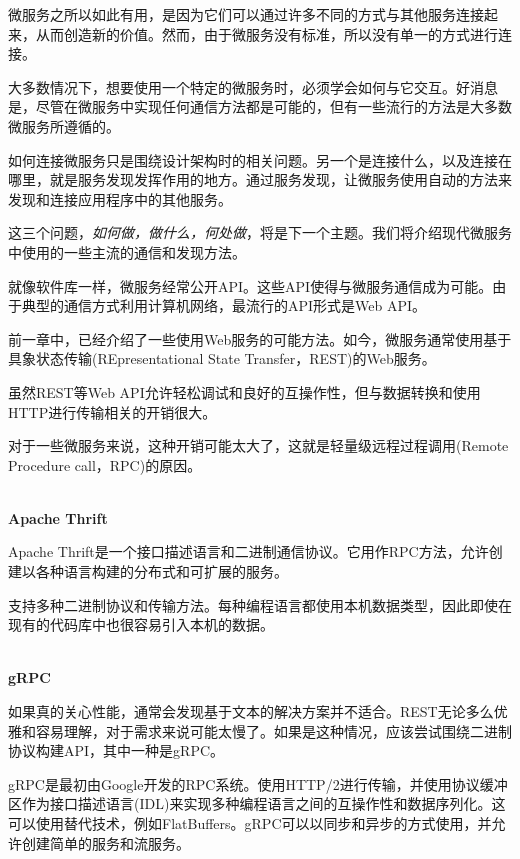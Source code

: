 
微服务之所以如此有用，是因为它们可以通过许多不同的方式与其他服务连接起来，从而创造新的价值。然而，由于微服务没有标准，所以没有单一的方式进行连接。

大多数情况下，想要使用一个特定的微服务时，必须学会如何与它交互。好消息是，尽管在微服务中实现任何通信方法都是可能的，但有一些流行的方法是大多数微服务所遵循的。

如何连接微服务只是围绕设计架构时的相关问题。另一个是连接什么，以及连接在哪里，就是服务发现发挥作用的地方。通过服务发现，让微服务使用自动的方法来发现和连接应用程序中的其他服务。

这三个问题，\textit{如何做，做什么，何处做}，将是下一个主题。我们将介绍现代微服务中使用的一些主流的通信和发现方法。


就像软件库一样，微服务经常公开API。这些API使得与微服务通信成为可能。由于典型的通信方式利用计算机网络，最流行的API形式是Web API。

前一章中，已经介绍了一些使用Web服务的可能方法。如今，微服务通常使用基于具象状态传输(REpresentational State Transfer，REST)的Web服务。


虽然REST等Web API允许轻松调试和良好的互操作性，但与数据转换和使用HTTP进行传输相关的开销很大。

对于一些微服务来说，这种开销可能太大了，这就是轻量级远程过程调用(Remote Procedure call，RPC)的原因。

\hspace*{\fill} \\ %
\noindent
\textbf{Apache Thrift}

Apache Thrift是一个接口描述语言和二进制通信协议。它用作RPC方法，允许创建以各种语言构建的分布式和可扩展的服务。

支持多种二进制协议和传输方法。每种编程语言都使用本机数据类型，因此即使在现有的代码库中也很容易引入本机的数据。

\hspace*{\fill} \\ %
\noindent
\textbf{gRPC}

如果真的关心性能，通常会发现基于文本的解决方案并不适合。REST无论多么优雅和容易理解，对于需求来说可能太慢了。如果是这种情况，应该尝试围绕二进制协议构建API，其中一种是gRPC。

gRPC是最初由Google开发的RPC系统。使用HTTP/2进行传输，并使用协议缓冲区作为接口描述语言(IDL)来实现多种编程语言之间的互操作性和数据序列化。这可以使用替代技术，例如FlatBuffers。gRPC可以以同步和异步的方式使用，并允许创建简单的服务和流服务。 

